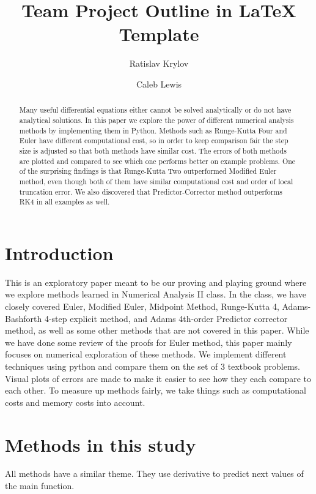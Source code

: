 \documentclass[11pt]{article}	%
\title{Team Project Outline in LaTeX Template}
\author{Ratislav Krylov \and Caleb Lewis}
\date{} %
\begin{document}
\maketitle

\begin{abstract}
Many useful differential equations either cannot be solved analytically or do not have analytical solutions. 
In this paper we explore the power of different numerical analysis methods by implementing
them in Python.
Methods such as Runge-Kutta Four and Euler have different computational cost, so in order
to keep comparison fair the step size is adjusted so that both methods have similar cost.
The errors of both methods are plotted and compared to see which one performs better on
example problems. One of the surprising findings is that Runge-Kutta Two outperformed 
Modified Euler method, even though both of them have similar computational cost and order of 
local truncation error. We also discovered that Predictor-Corrector method outperforms RK4 in
all examples as well. 
\end{abstract}

\section{Introduction}
This is an exploratory paper meant to be our proving and playing ground where we explore
methods learned in Numerical Analysis II class. In the class, we have closely covered Euler,
Modified Euler, Midpoint Method, Runge-Kutta 4, Adams-Bashforth 4-step explicit method,
and Adams 4th-order Predictor corrector method, as well as some other methods that are not
covered in this paper. While we have done some review of the proofs for Euler method, this 
paper mainly focuses on numerical exploration of these methods. We implement different techniques using python and compare them on the set of 3 textbook problems. Visual plots of errors are made 
to make it easier to see how they each compare to each other. To measure up methods fairly, we take
things such as computational costs and memory costs into account.

\section{Methods in this study}
All methods have a similar theme. They use derivative to predict next values of the main function.
\end{document}
